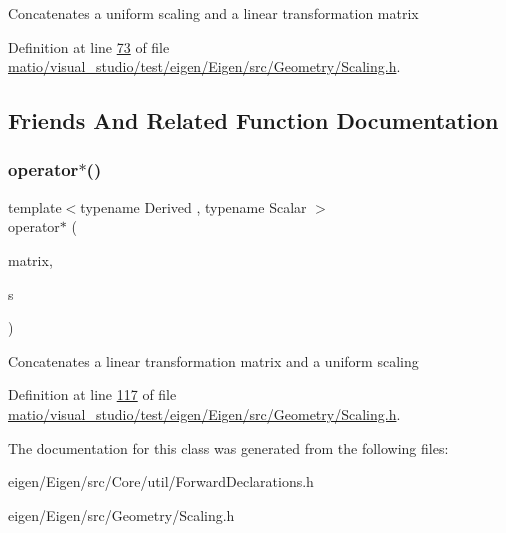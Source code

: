 Concatenates a uniform scaling and a linear transformation matrix 

Definition at line \hyperlink{matio_2visual__studio_2test_2eigen_2_eigen_2src_2_geometry_2_scaling_8h_source_l00073}{73} of file \hyperlink{matio_2visual__studio_2test_2eigen_2_eigen_2src_2_geometry_2_scaling_8h_source}{matio/visual\+\_\+studio/test/eigen/\+Eigen/src/\+Geometry/\+Scaling.\+h}.



\subsection{Friends And Related Function Documentation}
\mbox{\label{class_eigen_1_1_uniform_scaling_ga8f79e131479dbe709ee1173b1be9a8f0}} 
\subsubsection{\texorpdfstring{operator$\ast$()}{operator*()}}
{\footnotesize\ttfamily template$<$typename Derived , typename Scalar $>$ \\
operator$\ast$ (\begin{DoxyParamCaption}\item[{const \hyperlink{group___core___module_class_eigen_1_1_matrix_base}{Matrix\+Base}$<$ Derived $>$ \&}]{matrix,  }\item[{const \hyperlink{class_eigen_1_1_uniform_scaling}{Uniform\+Scaling}$<$ \hyperlink{class_eigen_1_1_uniform_scaling_a04c4339f58f1210c5d4d34b1bd7ae283}{Scalar} $>$ \&}]{s }\end{DoxyParamCaption})\hspace{0.3cm}{\ttfamily [related]}}

Concatenates a linear transformation matrix and a uniform scaling 

Definition at line \hyperlink{matio_2visual__studio_2test_2eigen_2_eigen_2src_2_geometry_2_scaling_8h_source_l00117}{117} of file \hyperlink{matio_2visual__studio_2test_2eigen_2_eigen_2src_2_geometry_2_scaling_8h_source}{matio/visual\+\_\+studio/test/eigen/\+Eigen/src/\+Geometry/\+Scaling.\+h}.



The documentation for this class was generated from the following files\+:\begin{DoxyCompactItemize}
\item 
eigen/\+Eigen/src/\+Core/util/\+Forward\+Declarations.\+h\item 
eigen/\+Eigen/src/\+Geometry/\+Scaling.\+h\end{DoxyCompactItemize}

